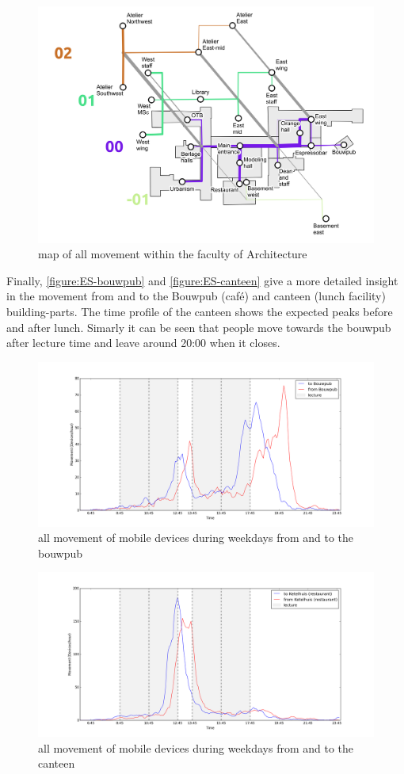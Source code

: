 \begin{figure}[H]
\centering
\includegraphics[scale=0.4]{bk_map_total.png}
\captionsetup{justification=centering}
\caption{map of all movement within the faculty of Architecture}
\label{figure:ES-buildingpartAllMap}
\end{figure}

Finally, \autoref{figure:ES-bouwpub} and \autoref{figure:ES-canteen} give a more detailed insight in the movement from and to the Bouwpub (café) and canteen (lunch facility) building-parts. The time profile of the canteen shows the expected peaks before and after lunch. Simarly it can be seen that people move towards the bouwpub after lecture time and leave around 20:00 when it closes. 

\begin{figure}[H]
\centering
\includegraphics[scale=0.2]{buildingpart_fromTo_bouwpubGraph.png}
\captionsetup{justification=centering}
\caption{all movement of mobile devices during weekdays from and to the bouwpub}
\label{figure:ES-bouwpub}
\end{figure}

\begin{figure}[H]
\centering
\includegraphics[scale=0.2]{buildingpart_fromTo_canteenGraph.png}
\captionsetup{justification=centering}
\caption{all movement of mobile devices during weekdays from and to the canteen}
\label{figure:ES-canteen}
\end{figure}
